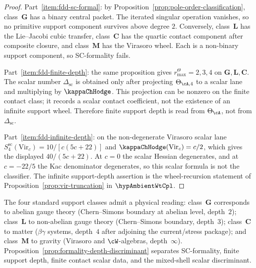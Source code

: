 \begin{proof}
Part~\eqref{item:fdd-sc-formal}: by
Proposition~\ref{prop:pole-order-classification}, class~\(\mathbf G\)
has a binary central packet.  The iterated singular operation vanishes,
so no primitive support component survives above degree \(2\).
Conversely, class~\(\mathbf L\) has the Lie--Jacobi cubic transfer,
class~\(\mathbf C\) has the quartic contact component after composite
closure, and class~\(\mathbf M\) has the Virasoro wheel.  Each is a
non-binary support component, so SC-formality fails.

Part~\eqref{item:fdd-finite-depth}: the same proposition gives
\(r^\Theta_{\max}=2,3,4\) on \(\mathbf G,\mathbf L,\mathbf C\).
The scalar number \(\Delta_{\mathrm{sc}}\) is obtained only after
projecting \(\Theta_{\cA,4}\) to a scalar lane and multiplying by
\(\kappaChHodge\).  This projection can be nonzero on the finite
contact class; it records a scalar contact coefficient, not the
existence of an infinite support wheel.  Therefore finite support depth
is read from \(\Theta_\cA\), not from \(\Delta_{\mathrm{sc}}\).

Part~\eqref{item:fdd-infinite-depth}: on the non-degenerate Virasoro
scalar lane \(S^{\mathrm{sc}}_4(\mathrm{Vir}_c)=10/[c(5c+22)]\) and
\(\kappaChHodge(\mathrm{Vir}_c)=c/2\), which gives the displayed
\(40/(5c+22)\).  At \(c=0\) the scalar Hessian degenerates, and at
\(c=-22/5\) the Kac denominator degenerates, so this scalar formula is
not the classifier.  The infinite support-depth assertion is the
wheel-recursion statement of Proposition~\ref{prop:vir-truncation} in
\(\hypAmbientWtCpl\).
\end{proof}

\begin{remark}
\label{rem:gauge-gravity-physics}%
%
The four standard support classes admit a physical reading:
class~$\mathbf{G}$ corresponds to abelian gauge theory
(Chern--Simons boundary at abelian level, depth~$2$);
class~$\mathbf{L}$ to non-abelian gauge theory
(Chern--Simons boundary, depth~$3$);
class~$\mathbf{C}$ to matter ($\beta\gamma$ systems,
depth~$4$ after adjoining the current/stress package);
and class~$\mathbf{M}$ to gravity (Virasoro and
$\cW$-algebras, depth~$\infty$).
Proposition~\ref{prop:formality-depth-discriminant}
separates SC-formality, finite support depth, finite contact scalar
data, and the mixed-shell scalar discriminant.
\end{remark}


